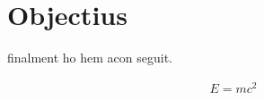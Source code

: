 \chapter{Objectius}
\label{c:objectius}
finalment ho hem acon seguit.
\date{\today}
\begin{align}
 E=mc^2
\end{align}
